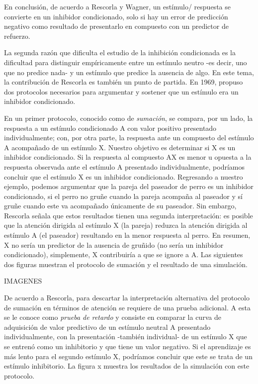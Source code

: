 \documentclass[
  letterpaper,
]{book}
\begin{document}
En conclusión, de acuerdo a Rescorla y Wagner, un estímulo/ respuesta se
convierte en un inhibidor condicionado, solo si hay un error de
predicción negativo como resultado de presentarlo en compuesto con un
predictor de refuerzo.

La segunda razón que dificulta el estudio de la inhibición condicionada
es la dificultad para distinguir empíricamente entre un estímulo neutro
-es decir, uno que no predice nada- y un estímulo que predice la
ausencia de algo. En este tema, la contribución de Rescorla es también
un punto de partida. En 1969, propuso dos protocolos necesarios para
argumentar y sostener que un estímulo era un inhibidor condicionado.

En un primer protocolo, conocido como de \emph{sumación}, se compara,
por un lado, la respuesta a un estímulo condicionado A con valor
positivo presentado individualmente; con, por otra parte, la respuesta
ante un compuesto del estímulo A acompañado de un estímulo X. Nuestro
objetivo es determinar si X es un inhibidor condicionado. Si la
respuesta al compuesto AX es menor u opuesta a la respuesta observada
ante el estímulo A presentado individualmente, podríamos concluir que el
estímulo X es un inhibidor condicionado. Regresando a nuestro ejemplo,
podemos argumentar que la pareja del paseador de perro es un inhibidor
condicionado, si el perro no gruñe cuando la pareja acompaña al paseador
y sí gruñe cuando este va acompañado únicamente de su paseador. Sin
embargo, Rescorla señala que estos resultados tienen una segunda
interpretación: es posible que la atención dirigida al estímulo X (la
pareja) reduzca la atención dirigida al estímulo A (el paseador)
resultando en la menor respuesta al perro. En resumen, X no sería un
predictor de la ausencia de gruñido (no sería un inhibidor
condicionado), simplemente, X contribuiría a que se ignore a A. Las
siguientes dos figuras muestran el protocolo de sumación y el resultado
de una simulación.

IMAGENES

De acuerdo a Rescorla, para descartar la interpretación alternativa del
protocolo de sumación en términos de atención se requiere de una prueba
adicional. A esta se le conoce como \emph{prueba de retardo} y consiste
en comparar la curva de adquisición de valor predictivo de un estímulo
neutral A presentado individualmente, con la presentación -también
individual- de un estímulo X que se entrenó como un inhibitorio y que
tiene un valor negativo. Si el aprendizaje es más lento para el segundo
estímulo X, podríamos concluir que este se trata de un estímulo
inhibitorio. La figura x muestra los resultados de la simulación con
este protocolo.
\end{document}
